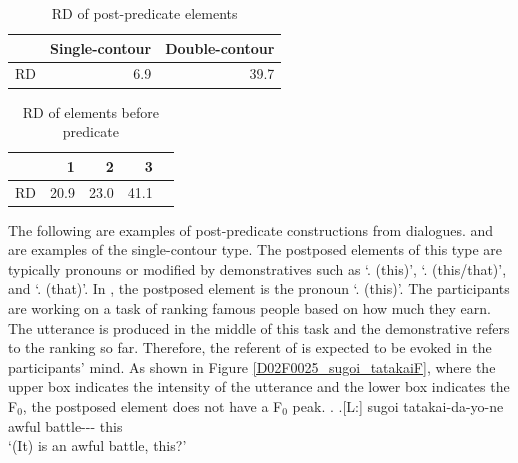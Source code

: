 \begin{table}
 \centering
 \caption{RD of post-predicate elements}
 \begin{tabular}{lrr}
 \toprule
   & Single-contour & Double-contour \\
 \midrule
  RD & 6.9 & 39.7 \\
 \bottomrule
 \end{tabular}
 \label{RDPostT}
\end{table}
\begin{table}
  \centering
 \caption{RD of elements before predicate}
 \begin{tabular}{lrrrr}
 \toprule
  &  1  & 2 & 3 \\
 \midrule
 RD & 20.9 & 23.0 & 41.1 \\
 \bottomrule
 \end{tabular}
 \label{RDPreT}
\end{table}

The following are examples of post-predicate constructions from dialogues.
\Next and \NNext are examples of the single-contour type.
The postposed elements of this type are typically pronouns or modified by demonstratives such as  `. (this)',  `. (this/that)', and  `. (that)'.
In \Next,
the postposed element is the pronoun  `. (this)'.
The participants are working on a task of ranking famous people based on how much they earn.
The utterance is produced in the middle of this task and
the demonstrative  refers to the ranking so far.
Therefore, the referent of  is expected to be evoked in the participants' mind.
As shown in Figure \ref{D02F0025_sugoi_tatakaiF},
where the upper box indicates the intensity of the utterance
and the lower box indicates the F$_{0}$,
the postposed element  does not have a F$_{0}$ peak.
%
\ex. \label{D02F0025_sugoi_tatakai}
	\ag.[L:] sugoi tatakai-da-yo-ne  \\
	awful battle--- this \\
	`(It) is an awful battle, this?'

